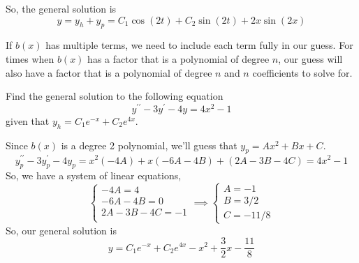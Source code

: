 \noindent
So, the general solution is
\begin{equation*}
	y = y_h + y_p = C_1\cos{(2t)} + C_2\sin{(2t)} + 2x\sin{(2x)}
\end{equation*}

\noindent
If $b(x)$ has multiple terms, we need to include each term fully in our guess. For times when $b(x)$ has a factor that is a polynomial of degree $n$, our guess will also have a factor that is a polynomial of degree $n$ and $n$ coefficients to solve for.
\begin{example}
	Find the general solution to the following equation
	\begin{equation*}
		y^{\prime\prime} - 3y^{\prime} - 4y = 4x^2 - 1
	\end{equation*}
	given that $y_h = C_1e^{-x} + C_2e^{4x}$.
\end{example}
\noindent
Since $b(x)$ is a degree 2 polynomial, we'll guess that $y_p = Ax^2 + Bx + C$.
\begin{equation*}
	y_p^{\prime\prime} - 3y_p^{\prime} - 4y_p = x^2(-4A) + x(-6A-4B) + (2A-3B-4C) = 4x^2 - 1
\end{equation*}
So, we have a system of linear equations,
\begin{equation*}
	\begin{cases}
		-4A = 4 \\
		-6A - 4B = 0 \\
		2A - 3B - 4C = -1 \\
	\end{cases} \implies \begin{cases}
		A = -1 \\
		B = 3/2 \\
		C = -11/8
	\end{cases}
\end{equation*}
So, our general solution is
\begin{equation*}
	y = C_1e^{-x} + C_2e^{4x} - x^2 + \frac{3}{2}x - \frac{11}{8}
\end{equation*}